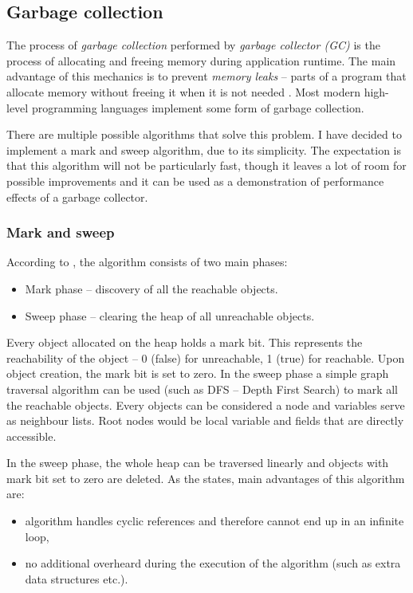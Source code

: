 \documentclass[thesis=M,english]{FITthesis}[2019/12/23]
\begin{document}
\subsection{Garbage collection}
The process of \textit{garbage collection} performed by \textit{garbage collector (GC)} is the process of allocating and freeing
memory during application runtime. The main advantage of this mechanics is to prevent \textit{memory leaks} -- parts of a program
that allocate memory without freeing it when it is not needed \cite{memleaks-raygun}. Most modern high-level programming languages
implement some form of garbage collection.

There are multiple possible algorithms that solve this problem. I have decided to implement a mark and sweep algorithm, due to
its simplicity. The expectation is that this algorithm will not be particularly fast, though it leaves a lot of room for possible
improvements and it can be used as a demonstration of performance effects of a garbage collector.

\subsubsection{Mark and sweep}
According to \cite{gc-ms}, the algorithm consists of two main phases:
\begin{itemize}
	\item Mark phase -- discovery of all the reachable objects.
	\item Sweep phase -- clearing the heap of all unreachable objects.
\end{itemize}

Every object allocated on the heap holds a mark bit. This represents the reachability of the object -- 0 (false) for
unreachable, 1 (true) for reachable. Upon object creation, the mark bit is set to zero. In the sweep phase a simple
graph traversal algorithm can be used (such as DFS -- Depth First Search) to mark all the reachable objects. Every
objects can be considered a node and variables serve as neighbour lists. Root nodes would be local variable and fields
that are directly accessible.

In the sweep phase, the whole heap can be traversed linearly and objects with mark bit set to zero are deleted. As the \cite{gc-ms}
states, main advantages of this algorithm are:
\begin{itemize}
	\item algorithm handles cyclic references and therefore cannot end up in an infinite loop,
	\item no additional overheard during the execution of the algorithm (such as extra data structures etc.).
\end{itemize}
\end{document}
